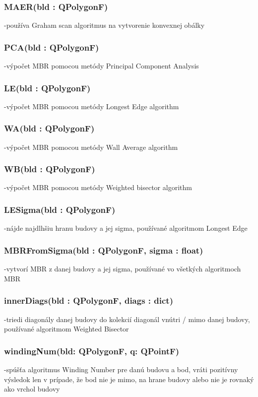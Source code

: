 \documentclass[12pt]{article}
\begin{document}
\subsubsection*{MAER(bld : QPolygonF)}
\noindent-používa Graham scan algoritmus na vytvorenie konvexnej obálky
\subsubsection*{PCA(bld : QPolygonF)}
\noindent-výpočet MBR pomocou metódy Principal Component Analysis
\subsubsection*{LE(bld : QPolygonF)}
\noindent-výpočet MBR pomocou metódy Longest Edge algorithm
\subsubsection*{WA(bld : QPolygonF)}
\noindent-výpočet MBR pomocou metódy Wall Average algorithm
\subsubsection*{WB(bld : QPolygonF)}
\noindent-výpočet MBR pomocou metódy Weighted bisector algorithm
\subsubsection*{LE\textunderscore Sigma(bld : QPolygonF)}
\noindent-nájde najdlhšiu hranu budovy a jej sigma, používané algoritmom Longest Edge
\subsubsection*{MBR\textunderscore FromSigma(bld : QPolygonF, sigma : float)}
\noindent-vytvorí MBR z danej budovy a jej sigma, používané vo všetkých algoritmoch MBR
\subsubsection*{innerDiags(bld : QPolygonF, diags : dict)}
\noindent-triedi diagonály danej budovy do kolekcií diagonál vnútri / mimo danej budovy, používané algoritmom Weighted Bisector
\subsubsection*{windingNum(bld: QPolygonF, q: QPointF)}
\noindent-spúšťa algoritmus Winding Number pre danú budovu a bod, vráti pozitívny výsledok len v prípade, že bod nie je mimo, na hrane budovy alebo nie je rovnaký ako vrchol budovy
\end{document}
